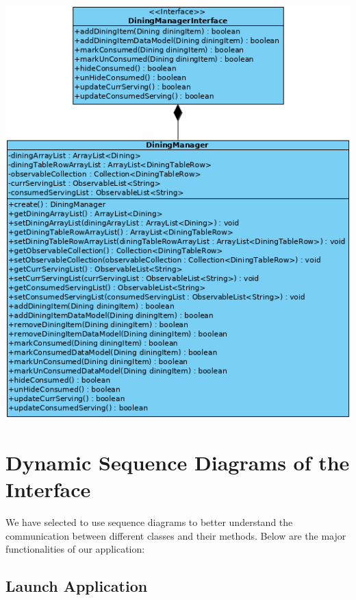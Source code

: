 \documentclass{scrreprt}
\begin{document}
\includegraphics{pictures/Business-Class-Diagram.png}

\chapter{Dynamic Sequence Diagrams of the Interface}

We have selected to use sequence diagrams to better understand the communication between different classes and their methods. Below are the major functionalities of our application:

\section{Launch Application}
\end{document}
